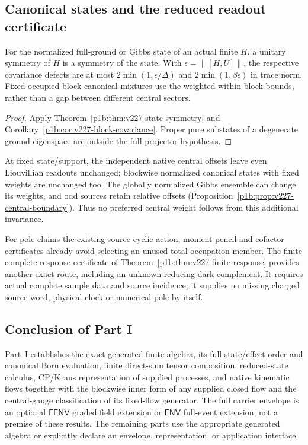 \documentclass[12pt,a4paper]{article}
\begin{document}
\subsection{Canonical states and the reduced readout certificate}
\label{p4:sec:v227-state-response}
\begin{corollary}
\label{p4:cor:v227-state-covariance}
For the normalized full-ground or Gibbs state of an actual finite $H$,
a unitary symmetry of $H$ is a symmetry of the state. With
$\epsilon=\|[H,U]\|$, the respective covariance defects are at most
$2\min(1,\epsilon/\Delta)$ and $2\min(1,\beta\epsilon)$ in trace norm.
Fixed occupied-block canonical mixtures use the weighted within-block
bounds, rather than a gap between different central sectors.
\end{corollary}
\begin{proof}
Apply Theorem~\ref{p1b:thm:v227-state-symmetry} and
Corollary~\ref{p1b:cor:v227-block-covariance}. Proper pure substates of a
degenerate ground eigenspace are outside the full-projector hypothesis.
\end{proof}
At fixed state/support, the independent native central offsets leave even
Liouvillian readouts unchanged; blockwise normalized canonical states with
fixed weights are unchanged too. The globally normalized Gibbs ensemble
can change its weights, and odd sources retain relative offsets
(Proposition~\ref{p1b:prop:v227-central-boundary}). Thus no preferred
central weight follows from this additional invariance.

For pole claims the existing source-cyclic action, moment-pencil and
cofactor certificates already avoid selecting an unused total occupation
member. The finite complete-response certificate of
Theorem~\ref{p1b:thm:v227-finite-response} provides another exact route,
including an unknown reducing dark complement. It requires actual complete
sample data and source incidence; it supplies no missing charged source
word, physical clock or numerical pole by itself.




\subsection{Conclusion of Part I}
\label{p4:sec:part1-conclusion}

Part~I establishes the exact generated finite algebra, its full state/effect
order and canonical Born evaluation, finite direct-sum tensor composition,
reduced-state calculus, CP/Kraus representation of supplied processes, and
native kinematic flows together with the blockwise inner form of any supplied
closed flow and the central-gauge classification of its fixed-flow generator.  The full carrier envelope is an optional
\(\mathsf{FENV}\) graded field extension or \(\mathsf{ENV}\) full-event
extension, not a premise of these results.
The remaining parts use the appropriate generated algebra or explicitly
declare an envelope, representation, or application interface.
\end{document}
